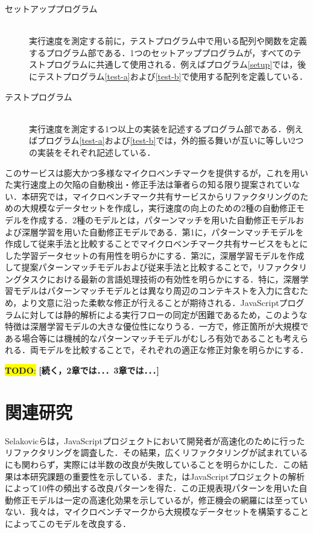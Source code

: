 \documentclass[T,J]{fose} %
\newcommand{\todo}[1]{\colorbox{yellow}{{\bf TODO}:}{\color{red} {\textbf{[#1]}}}}
\begin{document}
\begin{description}

\item[セットアッププログラム]\mbox{}\\
実行速度を測定する前に，テストプログラム中で用いる配列や関数を定義するプログラム部である．1つのセットアッププログラムが，すべてのテストプログラムに共通して使用される．例えばプログラム\ref{setup}では，後にテストプログラム\ref{test-a}および\ref{test-b}で使用する配列を定義している．

\item[テストプログラム]\mbox{}\\
実行速度を測定する1つ以上の実装を記述するプログラム部である．例えばプログラム\ref{test-a}および\ref{test-b}では，外的振る舞いが互いに等しい2つの実装をそれぞれ記述している．

\end{description}


このサービスは膨大かつ多様なマイクロベンチマークを提供するが，これを用いた実行速度上の欠陥の自動検出・修正手法は筆者らの知る限り提案されていない．本研究では，マイクロベンチマーク共有サービスからリファクタリングのための大規模なデータセットを作成し，実行速度の向上のための2種の自動修正モデルを作成する．2種のモデルとは，パターンマッチを用いた自動修正モデルおよび深層学習を用いた自動修正モデルである．第1に，パターンマッチモデルを作成して従来手法と比較することでマイクロベンチマーク共有サービスをもとにした学習データセットの有用性を明らかにする．第2に，深層学習モデルを作成して提案パターンマッチモデルおよび従来手法と比較することで，リファクタリングタスクにおける最新の言語処理技術の有効性を明らかにする．特に，深層学習モデルはパターンマッチモデルとは異なり周辺のコンテキストを入力に含むため，より文意に沿った柔軟な修正が行えることが期待される．JavaScriptプログラムに対しては静的解析による実行フローの同定が困難であるため，このような特徴は深層学習モデルの大きな優位性になりうる．一方で，修正箇所が大規模である場合等には機械的なパターンマッチモデルがむしろ有効であることも考えられる．両モデルを比較することで，それぞれの適正な修正対象を明らかにする．

\todo{続く，2章では．．．3章では．．．}


\section{関連研究}\label{sec:related}
Selakovicら\cite{Selakovic_2016}は，JavaScriptプロジェクトにおいて開発者が高速化のために行ったリファクタリングを調査した．その結果，広くリファクタリングが試まれているにも関わらず，実際には半数の改良が失敗していることを明らかにした．この結果は本研究課題の重要性を示している．また，\cite{Selakovic_2016}はJavaScriptプロジェクトの解析によって10件の頻出する改良パターンを得た．この正規表現パターンを用いた自動修正モデルは一定の高速化効果を示しているが，修正機会の網羅には至っていない．我々は，マイクロベンチマークから大規模なデータセットを構築することによってこのモデルを改良する．
\end{document}
